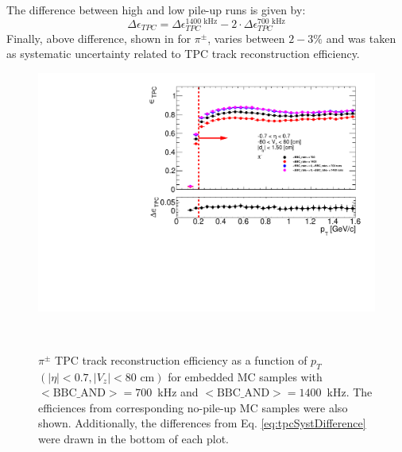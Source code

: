 The difference between high and low pile-up runs is given by:
\begin{equation}
\Delta\epsilon_{ TPC} =\Delta\epsilon_{ TPC}^{1400\text{ kHz}}-2\cdot\Delta\epsilon_{ TPC}^{700\text{ kHz}}
\label{eq:tpcSystDifference}
\end{equation}
Finally, above difference, shown in   for $\pi^\pm$, varies between $2-3\%$ and was taken as systematic uncertainty related to TPC track reconstruction efficiency.
\begin{figure}[hb]
	\caption[$\pi^\pm$ TPC track reconstruction efficiency as a function of $p_T$ $\left(|\eta|<0.7, |V_z|<80\text{ cm}\right)$ for embedded MC samples with \mbox{$<\text{BBC\_AND}>=700$~kHz} and \mbox{$<\text{BBC\_AND}>=1400$~kHz}]{$\pi^\pm$ TPC track reconstruction efficiency as a function of $p_T$ $\left(|\eta|<0.7, |V_z|<80\text{ cm}\right)$ for embedded MC samples with \mbox{$<\text{BBC\_AND}>=700$~kHz} and \mbox{$<\text{BBC\_AND}>=1400$~kHz}. The efficiences from corresponding no-pile-up MC samples were also shown. Additionally, the differences  from Eq. \ref{eq:tpcSystDifference} were drawn in the bottom of each plot.}
	\label{fig:systError1Dtpc}
	\centering
	\parbox{0.495\textwidth}{
		\centering
		\includegraphics[width=\linewidth,page=1]{graphics/systematicsEfficiency/bbc_and/tpcEffi_d0_1_5_etapt_1.pdf}\\
	}~
	\parbox{0.495\textwidth}{
		\centering
}
\end{figure}

